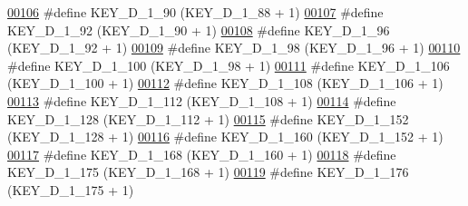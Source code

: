 \begin{DoxyCode}
\hypertarget{dmp_key_8h_source.tex_l00106}{}\hyperlink{dmp_key_8h_a1799daafc7f1c0c4ce5f3c7811e2f70c}{00106} \textcolor{preprocessor}{#define KEY\_D\_1\_90                  (KEY\_D\_1\_88 + 1)}
\hypertarget{dmp_key_8h_source.tex_l00107}{}\hyperlink{dmp_key_8h_add4af5ac6126e371445436c720b0ca38}{00107} \textcolor{preprocessor}{#define KEY\_D\_1\_92                  (KEY\_D\_1\_90 + 1)}
\hypertarget{dmp_key_8h_source.tex_l00108}{}\hyperlink{dmp_key_8h_ac6344fb39e1cba370c91ac2147eade2e}{00108} \textcolor{preprocessor}{#define KEY\_D\_1\_96                  (KEY\_D\_1\_92 + 1)}
\hypertarget{dmp_key_8h_source.tex_l00109}{}\hyperlink{dmp_key_8h_a26d9fb22968140339cec4da5c6feb8b1}{00109} \textcolor{preprocessor}{#define KEY\_D\_1\_98                  (KEY\_D\_1\_96 + 1)}
\hypertarget{dmp_key_8h_source.tex_l00110}{}\hyperlink{dmp_key_8h_a31535214bb1689eb7450b5671e285f91}{00110} \textcolor{preprocessor}{#define KEY\_D\_1\_100                 (KEY\_D\_1\_98 + 1)}
\hypertarget{dmp_key_8h_source.tex_l00111}{}\hyperlink{dmp_key_8h_a9def206df3655f69506bf353d0518745}{00111} \textcolor{preprocessor}{#define KEY\_D\_1\_106                 (KEY\_D\_1\_100 + 1)}
\hypertarget{dmp_key_8h_source.tex_l00112}{}\hyperlink{dmp_key_8h_accddb692fb2898367b88e281b73d9ce6}{00112} \textcolor{preprocessor}{#define KEY\_D\_1\_108                 (KEY\_D\_1\_106 + 1)}
\hypertarget{dmp_key_8h_source.tex_l00113}{}\hyperlink{dmp_key_8h_ac5c45471a712eb2970c85e03a4ab4f7d}{00113} \textcolor{preprocessor}{#define KEY\_D\_1\_112                 (KEY\_D\_1\_108 + 1)}
\hypertarget{dmp_key_8h_source.tex_l00114}{}\hyperlink{dmp_key_8h_ab17dc55a2d320dec80a00660e8ee0a75}{00114} \textcolor{preprocessor}{#define KEY\_D\_1\_128                 (KEY\_D\_1\_112 + 1)}
\hypertarget{dmp_key_8h_source.tex_l00115}{}\hyperlink{dmp_key_8h_a1e90238af4b07d64fe95d9d2e95d6021}{00115} \textcolor{preprocessor}{#define KEY\_D\_1\_152                 (KEY\_D\_1\_128 + 1)}
\hypertarget{dmp_key_8h_source.tex_l00116}{}\hyperlink{dmp_key_8h_aa715b843e85e6844277c39aef7b6b929}{00116} \textcolor{preprocessor}{#define KEY\_D\_1\_160                 (KEY\_D\_1\_152 + 1)}
\hypertarget{dmp_key_8h_source.tex_l00117}{}\hyperlink{dmp_key_8h_a69a742a9b4ee8a5ed4109b93e85604b5}{00117} \textcolor{preprocessor}{#define KEY\_D\_1\_168                 (KEY\_D\_1\_160 + 1)}
\hypertarget{dmp_key_8h_source.tex_l00118}{}\hyperlink{dmp_key_8h_ab6ca1f2a7510ffc9c23858f49843af88}{00118} \textcolor{preprocessor}{#define KEY\_D\_1\_175                 (KEY\_D\_1\_168 + 1)}
\hypertarget{dmp_key_8h_source.tex_l00119}{}\hyperlink{dmp_key_8h_aeff930bd54cde17b6cf381bc583bfc2d}{00119} \textcolor{preprocessor}{#define KEY\_D\_1\_176                 (KEY\_D\_1\_175 + 1)}

\end{DoxyCode}
